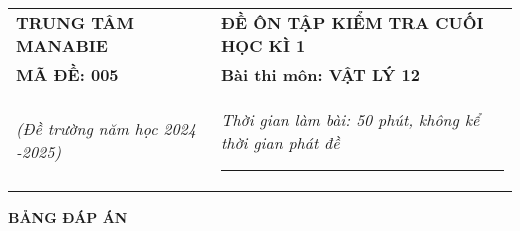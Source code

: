 \begin{tabular}{M{6.5cm}M{11cm}}
	\textbf{TRUNG TÂM MANABIE}& \textbf{ĐỀ ÔN TẬP KIỂM TRA CUỐI HỌC KÌ 1}\\
	\textbf{MÃ ĐỀ: 005}& \textbf{Bài thi môn: VẬT LÝ 12}\\
	\textit{(Đề trường  năm học 2024 -2025)}& \textit{Thời gian làm bài: 50 phút, không kể thời gian phát đề}
	
	\noindent\rule{4cm}{0.8pt} \\
\end{tabular}
\setcounter{section}{0}
\begin{center}
	\textbf{\large BẢNG ĐÁP ÁN}
\end{center}
\section{}
\section{}
\section{}



